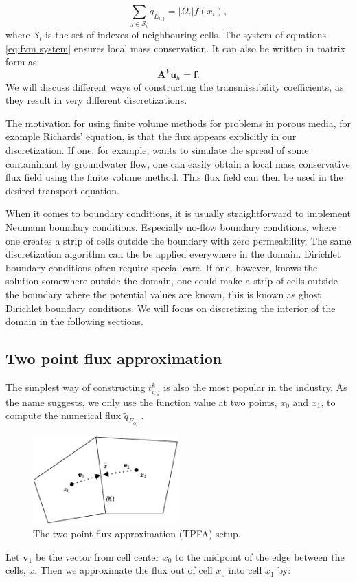 \documentclass[../Main/main.tex]{subfiles}
\begin{document}
	\begin{equation}\label{eq:fvm system}
		\sum_{j\in \mathcal{S}_i} \tilde{q}_{E_{i,j}} = |\Omega_i|f(x_i),
	\end{equation}
	where $\mathcal{S}_i$ is the set of indexes of neighbouring cells.
	The system of equations \eqref{eq:fvm system} ensures local mass conservation. It can also be written in matrix form as:
	\begin{equation}
		\bm{A}^V\tilde{\bm{u}}_h = \bm{f}.
	\end{equation}
	 We will discuss different ways of constructing the transmissibility coefficients, as they result in very different discretizations.
	\par
	The motivation for using finite volume methods for problems in porous media, for example Richards' equation, is that the flux appears explicitly in our discretization. If one, for example, wants to simulate the spread of some contaminant by groundwater flow, one can easily obtain a local mass conservative flux field using the finite volume method. This flux field can then be used in the desired transport equation.
	\par 
	When it comes to boundary conditions, it is usually straightforward to implement Neumann boundary conditions. Especially no-flow boundary conditions, where one creates a strip of cells outside the boundary with zero permeability. The same discretization algorithm can the be applied everywhere in the domain. Dirichlet boundary conditions often require special care. If one, however, knows the solution somewhere outside the domain, one could make a strip of cells outside the boundary where the potential values are known, this is known as ghost Dirichlet boundary conditions. We will focus on discretizing the interior of the domain in the following sections.
	\subsection{Two point flux approximation}
	The simplest way of constructing $t_{i,j}^k$ is also the most popular in the industry. As the name suggests, we only use the function value at two points, $x_{0}$ and $x_{1}$, to compute the numerical flux $\tilde{q}_{E_{0,1}}$.
	\begin{figure}[H]
		\centering
		\includegraphics[width=0.5\textwidth]{two point.pdf}
		\caption{The two point flux approximation (TPFA) setup.}
		\label{fig:tpfa control volume}
	\end{figure}
	Let $\bm{v}_1$ be the vector from cell center $x_0$ to the midpoint of the edge between the cells, $\overline{x}$. Then we approximate the flux out of cell $x_0$ into cell $x_1$ by:
	
\end{document}
